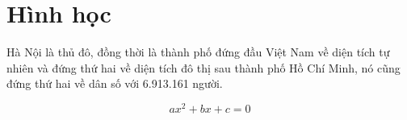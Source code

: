 \documentclass{scrreprt}
\begin{document}
\chapter{Hình học}
Hà Nội là thủ đô, đồng thời là thành phố đứng đầu Việt Nam về diện
tích tự nhiên và đứng thứ hai về diện tích đô thị sau thành phố Hồ Chí
Minh, nó cũng đứng thứ hai về dân số với 6.913.161 người.

$$ax^2 + bx + c = 0$$
\end{document}
